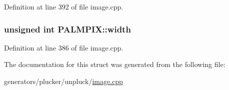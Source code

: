 Definition at line 392 of file image.\+cpp.

\hypertarget{structPALMPIX_a3c919d9d9bdf0bfdf67c7eb1f2c5a394}{
\subsubsection[{width}]{\setlength{\rightskip}{0pt plus 5cm}unsigned int P\+A\+L\+M\+P\+I\+X\+::width}}\label{structPALMPIX_a3c919d9d9bdf0bfdf67c7eb1f2c5a394}


Definition at line 386 of file image.\+cpp.



The documentation for this struct was generated from the following file\+:\begin{DoxyCompactItemize}
\item 
generators/plucker/unpluck/\hyperlink{image_8cpp}{image.\+cpp}\end{DoxyCompactItemize}
